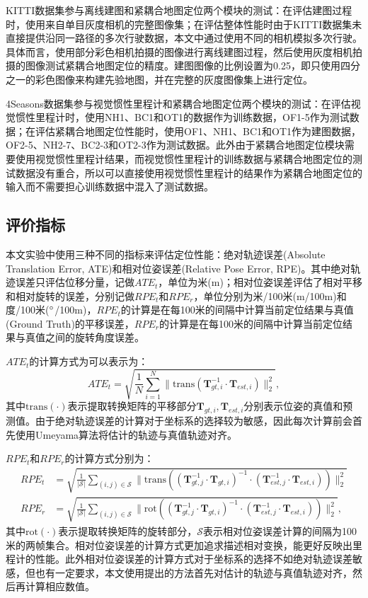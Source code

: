 KITTI数据集参与离线建图和紧耦合地图定位两个模块的测试：在评估建图过程时，使用来自单目灰度相机的完整图像集；在评估整体性能时由于KITTI数据集未直接提供沿同一路径的多次行驶数据，本文中通过使用不同的相机模拟多次行驶。具体而言，使用部分彩色相机拍摄的图像进行离线建图过程，然后使用灰度相机拍摄的图像测试紧耦合地图定位的精度。建图图像的比例设置为0.25，即只使用四分之一的彩色图像来构建先验地图，并在完整的灰度图像集上进行定位。

4Seasons数据集参与视觉惯性里程计和紧耦合地图定位两个模块的测试：在评估视觉惯性里程计时，使用NH1、BC1和OT1的数据作为训练数据，OF1-5作为测试数据；在评估紧耦合地图定位性能时，使用OF1、NH1、BC1和OT1作为建图数据，OF2-5、NH2-7、BC2-3和OT2-3作为测试数据。此外由于紧耦合地图定位模块需要使用视觉惯性里程计结果，而视觉惯性里程计的训练数据与紧耦合地图定位的测试数据没有重合，所以可以直接使用视觉惯性里程计的结果作为紧耦合地图定位的输入而不需要担心训练数据中混入了测试数据。

\subsection{评价指标}

本文实验中使用三种不同的指标来评估定位性能：绝对轨迹误差(Absolute Translation Error, ATE)\cite{sturm2012benchmark}和相对位姿误差(Relative Pose Error, RPE)\cite{geiger2012we}。其中绝对轨迹误差只评估位移分量，记做$ATE_t$，单位为米(m)；相对位姿误差评估了相对平移和相对旋转的误差，分别记做$RPE_{t}$和$RPE_{r}$，单位分别为米/100米(m/100m)和度/100米($\degree$/100m)，$RPE_{t}$的计算是在每100米的间隔中计算当前定位结果与真值(Ground Truth)的平移误差，$RPE_{r}$的计算是在每100米的间隔中计算当前定位结果与真值之间的旋转角度误差。

$ATE_t$的计算方式为可以表示为：
\begin{equation}
  ATE_t = \sqrt{\frac{1}{N}\sum_{i=1}^{N}\|\text{trans}(\symbf{T}_{gt,i}^{-1}\cdot \symbf{T}_{est,i})\|^{2}_{2}},
\end{equation}
其中$\text{trans}(\cdot)$表示提取转换矩阵的平移部分$\symbf{T}_{gt,i}, \symbf{T}_{est,i}$分别表示位姿的真值和预测值。由于绝对轨迹误差的计算对于坐标系的选择较为敏感，因此每次计算前会首先使用Umeyama算法\cite{arun1987least}将估计的轨迹与真值轨迹对齐。

$RPE_{t}$和$RPE_{r}$的计算方式分别为：
\begin{align}
  RPE_{t} &= \sqrt{\frac{1}{|\mathcal{S}|}\sum_{(i,j) \in \mathcal{S}}\| \text{trans}\left ((\symbf{T}_{gt,j}^{-1} \cdot \symbf{T}_{gt,i})^{-1}\cdot (\symbf{T}_{est,j}^{-1} \cdot \symbf{T}_{est,i}) \right ) \|_2^2} \\
  RPE_{r} &= \sqrt{\frac{1}{|\mathcal{S}|}\sum_{(i,j) \in \mathcal{S}}\| \text{rot}\left ((\symbf{T}_{gt,j}^{-1} \cdot \symbf{T}_{gt,i})^{-1}\cdot (\symbf{T}_{est,j}^{-1} \cdot \symbf{T}_{est,i}) \right ) \|_2^2},
\end{align}
其中$\text{rot}(\cdot)$表示提取转换矩阵的旋转部分，$\mathcal{S}$表示相对位姿误差计算的间隔为100米的两帧集合。相对位姿误差的计算方式更加追求描述相对变换，能更好反映出里程计的性能。此外相对位姿误差的计算方式对于坐标系的选择不如绝对轨迹误差敏感，但也有一定要求，本文使用\citet{li2023textslam}提出的方法首先对估计的轨迹与真值轨迹对齐，然后再计算相应数值。

